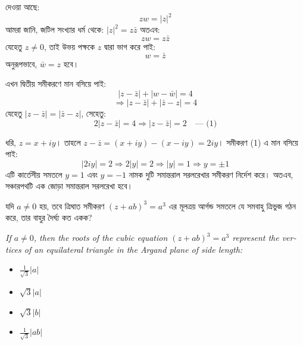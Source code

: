 \documentclass[12pt, a4paper]{article}
\begin{document}
\begin{tcolorbox}[solutionbox={সমাধান (Solution)}]
    \noindent
    দেওয়া আছে: 
    \[ zw = |z|^2 \]
    আমরা জানি, জটিল সংখ্যার ধর্ম থেকে: $|z|^2 = z \bar{z}$ 
    অতএব:
    \[ zw = z \bar{z} \]
    যেহেতু $z \neq 0$, তাই উভয় পক্ষকে $z$ দ্বারা ভাগ করে পাই:
    \[ w = \bar{z} \]
    অনুরূপভাবে, $\bar{w} = z$ হবে। 
    
    \vspace{0.5em}
    এখন দ্বিতীয় সমীকরণে মান বসিয়ে পাই:
    \[ |z - \bar{z}| + |w - \bar{w}| = 4 \]
    \[ \Rightarrow |z - \bar{z}| + |\bar{z} - z| = 4 \]
    যেহেতু $|z - \bar{z}| = |\bar{z} - z|$, সেহেতু:
    \[ 2 |z - \bar{z}| = 4 \Rightarrow |z - \bar{z}| = 2 \quad \text{--- (1)} \]
    
    \vspace{0.5em}
    ধরি, $z = x + iy$। তাহলে $z - \bar{z} = (x + iy) - (x - iy) = 2iy$। সমীকরণ (1) এ মান বসিয়ে পাই:
    \[ |2iy| = 2 \Rightarrow 2|y| = 2 \Rightarrow |y| = 1 \Rightarrow y = \pm 1 \]
    এটি কার্তেসীয় সমতলে $y = 1$ এবং $y = -1$ নামক দুটি সমান্তরাল সরলরেখার সমীকরণ নির্দেশ করে। 
    অতএব, সঞ্চারপথটি এক জোড়া সমান্তরাল সরলরেখা হবে।
\end{tcolorbox}

\vspace{1.5em}

\begin{tcolorbox}[questionbox={প্রশ্ন (Question) 10}]
    \noindent
    যদি $a \neq 0$ হয়, তবে ত্রিঘাত সমীকরণ $(z + ab)^3 = a^3$ এর মূলত্রয় আর্গন্ড সমতলে যে সমবাহু ত্রিভুজ গঠন করে, তার বাহুর দৈর্ঘ্য কত একক?
    
    \vspace{0.8em}
    \begin{english}
    \noindent\textit{\color{darkgray}
    If $a \neq 0$, then the roots of the cubic equation $(z + ab)^3 = a^3$ represent the vertices of an equilateral triangle in the Argand plane of side length:
    }
    \end{english}
\end{tcolorbox}

\begin{itemize}[label={}, leftmargin=1cm, itemsep=0.5em]
    \item[\textbf{A)}] $\frac{1}{\sqrt{3}} |a|$
    \item[\textbf{B)}] $\sqrt{3} |a|$
    \item[\textbf{C)}] $\sqrt{3} |b|$
    \item[\textbf{D)}] $\frac{1}{\sqrt{3}} |ab|$
\end{itemize}
\end{document}
